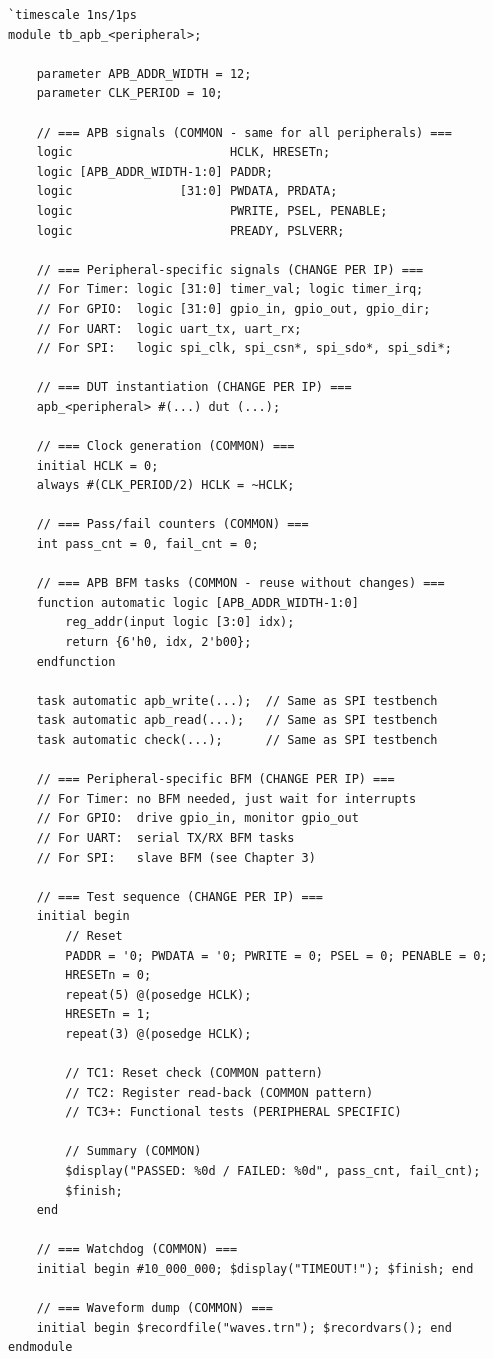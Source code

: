 \begin{lstlisting}[caption={Reusable APB Peripheral Testbench Template},label={lst:template}]
`timescale 1ns/1ps
module tb_apb_<peripheral>;

    parameter APB_ADDR_WIDTH = 12;
    parameter CLK_PERIOD = 10;

    // === APB signals (COMMON - same for all peripherals) ===
    logic                      HCLK, HRESETn;
    logic [APB_ADDR_WIDTH-1:0] PADDR;
    logic               [31:0] PWDATA, PRDATA;
    logic                      PWRITE, PSEL, PENABLE;
    logic                      PREADY, PSLVERR;

    // === Peripheral-specific signals (CHANGE PER IP) ===
    // For Timer: logic [31:0] timer_val; logic timer_irq;
    // For GPIO:  logic [31:0] gpio_in, gpio_out, gpio_dir;
    // For UART:  logic uart_tx, uart_rx;
    // For SPI:   logic spi_clk, spi_csn*, spi_sdo*, spi_sdi*;

    // === DUT instantiation (CHANGE PER IP) ===
    apb_<peripheral> #(...) dut (...);

    // === Clock generation (COMMON) ===
    initial HCLK = 0;
    always #(CLK_PERIOD/2) HCLK = ~HCLK;

    // === Pass/fail counters (COMMON) ===
    int pass_cnt = 0, fail_cnt = 0;

    // === APB BFM tasks (COMMON - reuse without changes) ===
    function automatic logic [APB_ADDR_WIDTH-1:0]
        reg_addr(input logic [3:0] idx);
        return {6'h0, idx, 2'b00};
    endfunction

    task automatic apb_write(...);  // Same as SPI testbench
    task automatic apb_read(...);   // Same as SPI testbench
    task automatic check(...);      // Same as SPI testbench

    // === Peripheral-specific BFM (CHANGE PER IP) ===
    // For Timer: no BFM needed, just wait for interrupts
    // For GPIO:  drive gpio_in, monitor gpio_out
    // For UART:  serial TX/RX BFM tasks
    // For SPI:   slave BFM (see Chapter 3)

    // === Test sequence (CHANGE PER IP) ===
    initial begin
        // Reset
        PADDR = '0; PWDATA = '0; PWRITE = 0; PSEL = 0; PENABLE = 0;
        HRESETn = 0;
        repeat(5) @(posedge HCLK);
        HRESETn = 1;
        repeat(3) @(posedge HCLK);

        // TC1: Reset check (COMMON pattern)
        // TC2: Register read-back (COMMON pattern)
        // TC3+: Functional tests (PERIPHERAL SPECIFIC)

        // Summary (COMMON)
        $display("PASSED: %0d / FAILED: %0d", pass_cnt, fail_cnt);
        $finish;
    end

    // === Watchdog (COMMON) ===
    initial begin #10_000_000; $display("TIMEOUT!"); $finish; end

    // === Waveform dump (COMMON) ===
    initial begin $recordfile("waves.trn"); $recordvars(); end
endmodule
\end{lstlisting}

